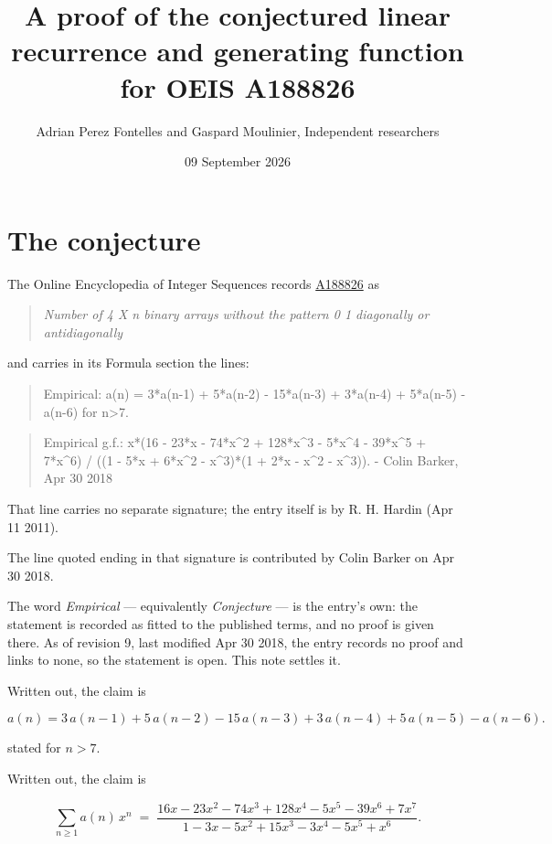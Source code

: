 \documentclass[11pt]{article}
\title{A proof of the conjectured linear recurrence and generating function for OEIS A188826}
\author{Adrian Perez Fontelles and Gaspard Moulinier, Independent researchers}
\date{09 September 2026}
\theoremstyle{definition}
\begin{document}
\maketitle
\section{The conjecture}

The Online Encyclopedia of Integer Sequences records \href{https://oeis.org/A188826}{A188826} as

\begin{quote}\itshape Number of 4 X n binary arrays without the pattern 0 1 diagonally or antidiagonally\end{quote}

and carries in its Formula section the lines:

\begin{quote}\ttfamily Empirical: a(n) = 3*a(n-1) + 5*a(n-2) - 15*a(n-3) + 3*a(n-4) + 5*a(n-5) - a(n-6) for n>7.\end{quote}

\begin{quote}\ttfamily Empirical g.f.: x*(16 - 23*x - 74*x\textasciicircum{}2 + 128*x\textasciicircum{}3 - 5*x\textasciicircum{}4 - 39*x\textasciicircum{}5 + 7*x\textasciicircum{}6) / ((1 - 5*x + 6*x\textasciicircum{}2 - x\textasciicircum{}3)*(1 + 2*x - x\textasciicircum{}2 - x\textasciicircum{}3)). - Colin Barker, Apr 30 2018\end{quote}

That line carries no separate signature; the entry itself is by R. H. Hardin (Apr 11 2011).

The line quoted ending in that signature is contributed by Colin Barker on Apr 30 2018.

The word {\itshape Empirical} --- equivalently {\itshape Conjecture} --- is the entry's own: the statement is recorded as fitted to the published terms, and no proof is given there. As of revision 9, last modified Apr 30 2018, the entry records no proof and links to none, so the statement is open. This note settles it.

Written out, the claim is

\[a(n) = 3\,a(n-1) + 5\,a(n-2) - 15\,a(n-3) + 3\,a(n-4) + 5\,a(n-5) - a(n-6).\]

stated for $n > 7$.

Written out, the claim is

\[\sum_{n \ge 1} a(n)\,x^n \;=\; \frac{16x - 23x^{2} - 74x^{3} + 128x^{4} - 5x^{5} - 39x^{6} + 7x^{7}}{1 - 3x - 5x^{2} + 15x^{3} - 3x^{4} - 5x^{5} + x^{6}}.\]
\end{document}
